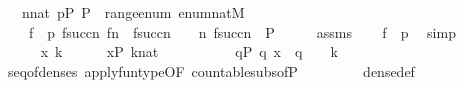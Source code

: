 \begin{isabellebody}
\ \ \ {\isachardoublequoteopen}n{\isasymin}nat{\isachardoublequoteclose}\ {\isachardoublequoteopen}p{\isasymin}P{\isachardoublequoteclose}\ {\isachardoublequoteopen}P\ {\isasymsubseteq}\ range{\isacharparenleft}{\kern0pt}enum{\isacharparenright}{\kern0pt}{\isachardoublequoteclose}\ {\isachardoublequoteopen}enum{\isacharcolon}{\kern0pt}nat{\isasymrightarrow}M{\isachardoublequoteclose}\isanewline
\ \ \ \isanewline
\ \ \ \ {\isachardoublequoteopen}f{\isacharbackquote}{\kern0pt}{}\ {\isacharequal}{\kern0pt}\ p{\isachardoublequoteclose}\ {\isachardoublequoteopen}f{\isacharbackquote}{\kern0pt}succ{\isacharparenleft}{\kern0pt}n{\isacharparenright}{\kern0pt}{\isasympreceq}\ f{\isacharbackquote}{\kern0pt}n\ {\isasymand}\ f{\isacharbackquote}{\kern0pt}succ{\isacharparenleft}{\kern0pt}n{\isacharparenright}{\kern0pt}\ {\isasymin}\ {\isasymD}\ {\isacharbackquote}{\kern0pt}\ n{\isachardoublequoteclose}\ {\isachardoublequoteopen}f{\isacharbackquote}{\kern0pt}succ{\isacharparenleft}{\kern0pt}n{\isacharparenright}{\kern0pt}\ {\isasymin}\ P{\isachardoublequoteclose}\isanewline
%
\isadelimproof
%
\endisadelimproof
%
\isatagproof
{}\isamarkupfalse%
\ {\isacharminus}{\kern0pt}\isanewline
\ \ \isamarkupfalse%
\ assms\isanewline
\ \ \isamarkupfalse%
\ {\isachardoublequoteopen}f{\isacharbackquote}{\kern0pt}{}\ {\isacharequal}{\kern0pt}\ p{\isachardoublequoteclose}\ \isamarkupfalse%
\ simp\isanewline
\ \ \isacommand{{\isacharbraceleft}{\kern0pt}}\isamarkupfalse%
\isanewline
\ \ \ \ \isamarkupfalse%
\ x\ k\isanewline
\ \ \ \ \isamarkupfalse%
\ {\isachardoublequoteopen}x{\isasymin}P{\isachardoublequoteclose}\ {\isachardoublequoteopen}k{\isasymin}nat{\isachardoublequoteclose}\isanewline
\ \ \ \ \isamarkupfalse%
\isanewline
\ \ \ \ \isamarkupfalse%
\ {\isachardoublequoteopen}{\isasymexists}q{\isasymin}P{\isachardot}{\kern0pt}\ q{\isasympreceq}\ x\ {\isasymand}\ q\ {\isasymin}\ {\isasymD}\ {\isacharbackquote}{\kern0pt}\ k{\isachardoublequoteclose}\isanewline
\ \ \ \ \ \ \isamarkupfalse%
\ seq{\isacharunderscore}{\kern0pt}of{\isacharunderscore}{\kern0pt}denses\ apply{\isacharunderscore}{\kern0pt}funtype{\isacharbrackleft}{\kern0pt}OF\ countable{\isacharunderscore}{\kern0pt}subs{\isacharunderscore}{\kern0pt}of{\isacharunderscore}{\kern0pt}P{\isacharbrackright}{\kern0pt}\ \isanewline
\ \ \ \ \ \ \isamarkupfalse%
\ dense{\isacharunderscore}{\kern0pt}def\ \isamarkupfalse%

\end{isabellebody}
